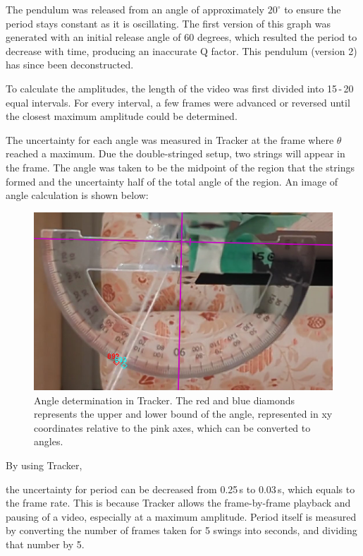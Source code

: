 \documentclass[12pt]{article}
\begin{document}
{\color{blue}
The pendulum was released from an angle of approximately $20^\circ$ to ensure the period stays constant as it is oscillating. The first version of this graph was generated with an initial release angle of 60 degrees, which resulted the period to decrease with time, producing an inaccurate Q factor. This pendulum (version 2) has since been deconstructed.

To calculate the amplitudes, the length of the video was first divided into 15\,-\,20 equal intervals. For every interval, a few frames were advanced or reversed until the closest maximum amplitude could be determined.

\newpage

The uncertainty for each angle was measured in Tracker \cite{tracker} at the frame where $\theta$ reached a maximum. Due the double-stringed setup, two strings will appear in the frame. The angle was taken to be the midpoint of the region that the strings formed and the uncertainty half of the total angle of the region. An image of angle calculation is shown below:

\begin{figure}[!hptb]
    \centering
    \includegraphics[width=\textwidth]{../figures/tracker.png}
    \caption{\centering Angle determination in Tracker. The red and blue diamonds represents the upper and lower bound of the angle, represented in xy coordinates relative to the pink axes, which can be converted to angles.}
    \label{fig:figure5}
\end{figure}

By using Tracker, }the uncertainty for period can be decreased from 0.25\,s to 0.03\,s, which equals to the frame rate. This is because Tracker allows the frame-by-frame playback and pausing of a video, especially at a maximum amplitude. {\color{blue}Period itself is measured by converting the number of frames taken for 5 swings into seconds, and dividing that number by 5.}
\end{document}

